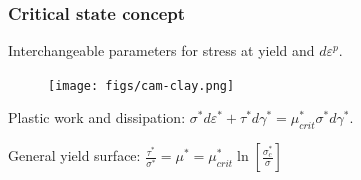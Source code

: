\documentclass[notes]{beamer}
\begin{document}
\begin{frame}
	\frametitle{Critical state concept}
	Interchangeable parameters for stress at yield and $d\varepsilon^p$.
	\begin{figure}
		\texttt{[image: figs/cam-clay.png]}
	\end{figure}
	Plastic work and dissipation: $\sigma^* d \varepsilon^* + \tau^* d\gamma^* = \mu_{crit}^* \sigma^* d \gamma^*$.
	
	General yield surface: $\frac{\tau^*}{\sigma^*} = \mu^* = \mu^*_{crit} \ln \left[\frac{\sigma_c^*}{\sigma}\right]$
\end{frame}
\end{document}
